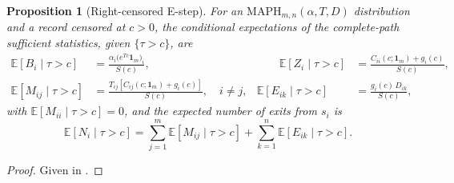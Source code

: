 \documentclass{article}
\newtheorem{proposition}{Proposition}
\newcommand{\ex}[1]{\mathbb{E}\left[#1\right]}
\begin{document}
\begin{proposition}[Right-censored E-step]
\label{prop:e-step-censored}
For an $\text{MAPH}_{m,n}(\alpha,T,D)$ distribution and a record censored at $c>0$, the conditional expectations of the complete-path sufficient statistics, given $\{\tau>c\}$, are
\begin{equation}
\label{eq:censored-estats}
\begin{aligned}
\ex{B_{i} \mid \tau>c}
  &=\frac{\alpha_i\big(e^{Tc}\mathbf 1_m\big)_i}{S(c)},
&\qquad
\ex{Z_i \mid \tau>c}
  &=\frac{C_{ii}(c;\mathbf 1_m)+g_i(c)}{S(c)},\\[3pt]
\ex{M_{ij} \mid \tau>c}
  &=\frac{T_{ij}\left[C_{ij}(c;\mathbf 1_m)+g_i(c)\right]}{S(c)},\quad i\ne j,
&
\ex{E_{ik} \mid \tau>c}
  &=\frac{g_i(c)\,D_{ik}}{S(c)},
\end{aligned}
\end{equation}
with $\ex{M_{ii} \mid \tau>c}=0$, and the expected number of exits from $s_i$ is
\begin{equation}
\label{eq:censored-N}
\ex{N_i \mid \tau>c}=\sum_{j=1}^m\ex{M_{ij} \mid \tau>c}+\sum_{k=1}^n\ex{E_{ik} \mid \tau>c}.
\end{equation}
\end{proposition}
\begin{proof}
Given in .
\end{proof}
\end{document}
